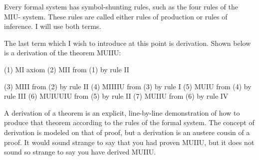 Every formal system has symbol-shunting rules, such as the four rules of the MIU- system. These rules are called either rules of production or rules of inference. I will use both terms. 

The last term which I wish to introduce at this point is derivation. Shown below is a derivation of the theorem MUIIU: 

(1) MI                            axiom (2) MII                           from (1) by rule II 



(3) MIII                         from (2) by rule II (4) MIIIIU                       from (3) by rule I (5) MUIU                         from (4) by rule III (6) MUIUUIU                      from (5) by rule II (7) MUIIU                        from (6) by rule IV 

A derivation of a theorem is an explicit, line-by-line demonstration of how to produce that theorem according to the rules of the formal system. The concept of derivation is modeled on that of proof, but a derivation is an austere cousin of a proof. It would sound strange to say that you had proven MUIIU, but it does not sound so strange to say you have derived MUIIU. 

